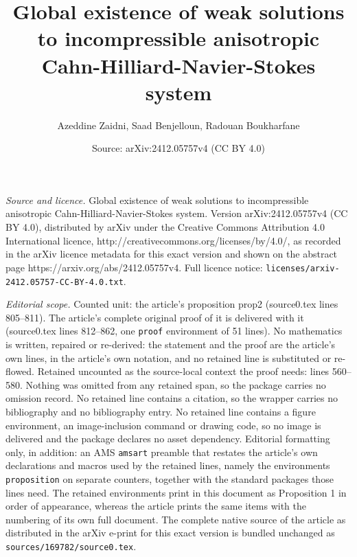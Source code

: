 \documentclass[10pt,a4paper]{amsart}
\title{Global existence of weak solutions to incompressible anisotropic Cahn-Hilliard-Navier-Stokes system}
\author{Azeddine Zaidni, Saad Benjelloun, Radouan Boukharfane}
\date{Source: arXiv:2412.05757v4 (CC BY 4.0)}
\begin{document}
\maketitle

\noindent\emph{Source and licence.} Global existence of weak solutions to incompressible anisotropic Cahn-Hilliard-Navier-Stokes system. Version arXiv:2412.05757v4 (CC BY 4.0), distributed by arXiv under the Creative Commons Attribution 4.0 International licence, http://creativecommons.org/licenses/by/4.0/, as recorded in the arXiv licence metadata for this exact version and shown on the abstract page https://arxiv.org/abs/2412.05757v4. Full licence notice: \texttt{licenses/arxiv-2412.05757-CC-BY-4.0.txt}.\par\smallskip

\noindent\textit{Editorial scope.} Counted unit: the article's proposition prop2 (source0.tex lines 805--811). The article's complete original proof of it is delivered with it (source0.tex lines 812--862, one \texttt{proof} environment of 51 lines). No mathematics is written, repaired or re-derived: the statement and the proof are the article's own lines, in the article's own notation, and no retained line is substituted or re-flowed.  Retained uncounted as the source-local context the proof needs: lines 560--580.  Nothing was omitted from any retained span, so the package carries no omission record.  No retained line contains a citation, so the wrapper carries no bibliography and no bibliography entry.  No retained line contains a figure environment, an image-inclusion command or drawing code, so no image is delivered and the package declares no asset dependency.  Editorial formatting only, in addition: an AMS \texttt{amsart} preamble that restates the article's own declarations and macros used by the retained lines, namely the environments \texttt{proposition} on separate counters, together with the standard packages those lines need.  The retained environments print in this document as Proposition 1 in order of appearance, whereas the article prints the same items with the numbering of its own full document.  The complete native source of the article as distributed in the arXiv e-print for this exact version is bundled unchanged as \texttt{sources/169782/source0.tex}.
\end{document}
